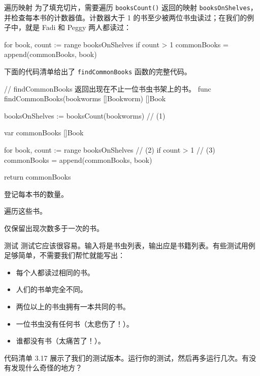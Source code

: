 \begin{infobox}{遍历映射}
为了填充切片，需要遍历 \texttt{booksCount()} 返回的映射 \texttt{booksOnShelves}，并检查每本书的计数器值。计数器大于 1 的书至少被两位书虫读过；在我们的例子中，就是 Fadi 和 Peggy 两人都读过：

\begin{gocode}[]
for book, count := range booksOnShelves {
    if count > 1 {
        commonBooks = append(commonBooks, book)
    }
}
\end{gocode}
\end{infobox}

下面的代码清单给出了 \texttt{findCommonBooks} 函数的完整代码。

\begin{gocode}[title={代码清单 3.16 \texttt{bookworm.go}：实现 \texttt{findCommonBooks()}}]
// findCommonBooks 返回出现在不止一位书虫书架上的书。
func findCommonBooks(bookworms []Bookworm) []Book {
    booksOnShelves := booksCount(bookworms) // (1)

    var commonBooks []Book

    for book, count := range booksOnShelves { // (2)
        if count > 1 {                         // (3)
            commonBooks = append(commonBooks, book)
        }
    }

    return commonBooks
}
\end{gocode}

\begin{codeannotations}
  \item 登记每本书的数量。
  \item 遍历这些书。
  \item 仅保留出现次数多于一次的书。
\end{codeannotations}

\begin{infobox}{测试}
测试它应该很容易。输入将是书虫列表，输出应是书籍列表。有些测试用例足够简单，不需要我们帮忙就能写出：

\begin{itemize}
  \item 每个人都读过相同的书。
  \item 人们的书单完全不同。
  \item 两位以上的书虫拥有一本共同的书。
  \item 一位书虫没有任何书（太悲伤了！）。
  \item 谁都没有书（太痛苦了！）。
\end{itemize}

代码清单 3.17 展示了我们的测试版本。运行你的测试，然后再多运行几次。有没有发现什么奇怪的地方？
\end{infobox}

